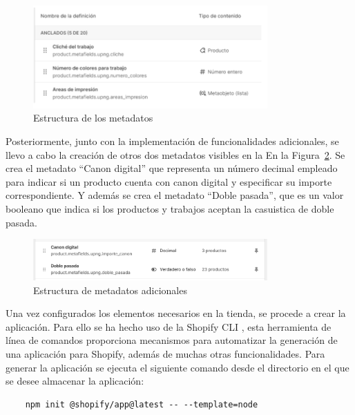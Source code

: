 \documentclass[12pt]{article}
\begin{document}
\begin{figure}[ht]
    \centering
    \includegraphics[width=0.8\textwidth]{imagenesUS2/creacionMetafields.png}
    \caption{\label{fig:metadatos}Estructura de los metadatos}
    \vspace{\fill}
\end{figure}

Posteriormente, junto con la implementación de funcionalidades adicionales, se llevo a cabo la creación de otros dos metadatos visibles en la En la Figura~\ref{fig:metafieldsAdicionales}. 
Se crea el metadato  ``Canon digital'' que representa un número decimal empleado para indicar si un producto cuenta con canon digital y especificar su importe correspondiente. Y además
se crea el metadato ``Doble pasada'', que es un valor booleano que indica si los productos y trabajos aceptan la casuistica de doble pasada.

\begin{figure}[ht]
    \centering
    \includegraphics[width=0.8\textwidth]{imagenesUS2/metafieldsAdicionales.png}
    \caption{\label{fig:metafieldsAdicionales}Estructura de metadatos adicionales}
    \vspace{\fill}
\end{figure}

Una vez configurados los elementos necesarios en la tienda, se procede a crear la aplicación. Para ello se ha hecho uso de la Shopify CLI \cite{shopify-cli}, esta herramienta
de línea de comandos proporciona mecanismos para automatizar la generación de una aplicación para Shopify, además de muchas otras funcionalidades.
Para generar la aplicación se ejecuta el siguiente comando desde el directorio en el que se desee almacenar la aplicación: 
\begin{lstlisting}
    npm init @shopify/app@latest -- --template=node
\end{lstlisting}
\end{document}
